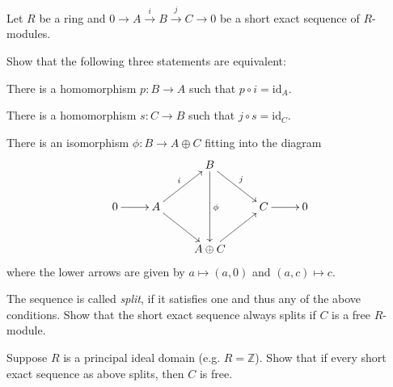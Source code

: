 \documentclass[11pt]{book}
\numberwithin{dummy}{section}
\theoremstyle{nonumberbreak}
\newenvironment{prob}[1][]{\ifthenelse{\equal{#1}{}}{\problem}{\problem[#1]}\rm}{\endproblem}
\newcommand{\la}{\longrightarrow}
\newcommand{\id}{\mathrm{id}}
\newcommand{\Z}{\mathbb{Z}}
\begin{document}
\begin{spacing}{1.4}
\begin{prob} %
Let $R$ be a ring and $0 \la A \overset{i}{\la} B \overset{j}{\la} C \la 0$ be a short exact sequence of $R$-modules.
\begin{compactenum}
\item Show that the following three statements are equivalent:
\begin{compactenum}
\item There is a homomorphism $p:B \la A$ such that $p \circ i = \id_A$.
\item There is a homomorphism $s: C \la B$ such that $j \circ s = \id_C$.
\item There is an isomorphism $\phi: B \la A\oplus C$ fitting into the diagram
$$
\begin{xy}
\xymatrix{
&&B \ar[dd]^{\phi} \ar[rd]^{j} &&\\
0 \ar[r] & A \ar[ru]^{i} \ar[rd] && C \ar[r] & 0 \\
&& A \oplus C \ar[ru] &&
}
\end{xy}
$$
where the lower arrows are given by $a \mapsto (a,0)$ and $(a,c) \mapsto c$.

\end{compactenum}
\item The sequence is called \textit{split}, if it satisfies one and thus any of the above conditions. Show that the short exact sequence always splits if $C$ is a free $R$-module.
\item Suppose $R$ is a principal ideal domain (e.g. $R=\Z$). Show that if every short exact sequence as above splits, then $C$ is free.
\end{compactenum}


\end{prob}
\end{spacing}
\end{document}
